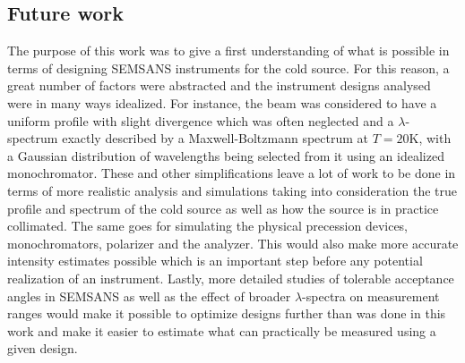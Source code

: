 \documentclass{article}
\begin{document}
\subsection{Future work}
The purpose of this work was to give a first understanding of what is possible in terms of designing SEMSANS instruments for the cold source. For this reason, a great number of factors were abstracted and the instrument designs analysed were in many ways idealized. For instance, the beam was considered to have a uniform profile with slight divergence which was often neglected and a $\lambda$-spectrum exactly described by a Maxwell-Boltzmann spectrum at $T=20\unit\kelvin$, with a Gaussian distribution of wavelengths being selected from it using an idealized monochromator. These and other simplifications leave a lot of work to be done in terms of more realistic analysis and simulations taking into consideration the true profile and spectrum of the cold source as well as how the source is in practice collimated. The same goes for simulating the physical precession devices, monochromators, polarizer and the analyzer. This would also make more accurate intensity estimates possible which is an important step before any potential realization of an instrument. Lastly, more detailed studies of tolerable acceptance angles in SEMSANS as well as the effect of broader $\lambda$-spectra on measurement ranges would make it possible to optimize designs further than was done in this work and make it easier to estimate what can practically be measured using a given design.

\newpage
\printbibliography
\end{document}
